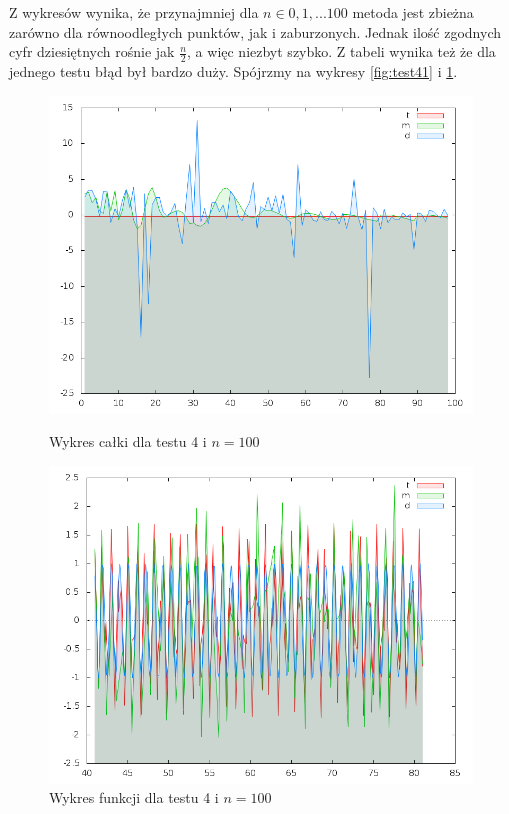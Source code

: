 \documentclass[11pt,wide]{mwart}
\begin{document}
Z wykresów wynika, że przynajmniej dla $n\in{0,1,...100}$ metoda jest zbieżna zarówno dla równoodległych punktów, jak i zaburzonych. Jednak ilość zgodnych cyfr dziesiętnych rośnie jak $\frac{n}{2}$, a więc niezbyt szybko. Z tabeli wynika też że dla jednego testu błąd był bardzo duży. Spójrzmy na wykresy \ref{fig:test41} i \ref{fig:test42}.\\
\begin{figure}[!h]
  \begin{minipage}[b]{0.45\linewidth}
    \centering
    \includegraphics[width=\linewidth]{./wykresy/test4_int.png}
    \caption{Wykres całki dla testu 4 i $n=100$}
    \label{fig:test41}
  \end{minipage}
  \hspace{0.5cm}
  \begin{minipage}[b]{0.45\linewidth}
    \centering
    \includegraphics[width=\linewidth]{./wykresy/test4_spline.png}
    \caption{Wykres funkcji dla testu 4 i $n=100$}
    \label{fig:test42}
  \end{minipage}
\end{figure}
\end{document}
